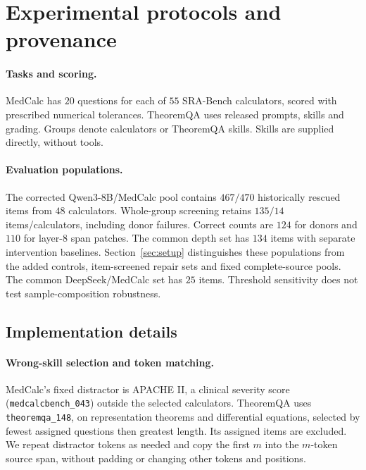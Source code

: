 \section{Experimental protocols and provenance}
\label{app:setup}

\paragraph{Tasks and scoring.}
MedCalc has $20$ questions for each of $55$ SRA-Bench calculators, scored
with prescribed numerical tolerances. TheoremQA uses released prompts,
skills and grading. Groups denote calculators or TheoremQA skills.
Skills are supplied directly, without tools.

\paragraph{Evaluation populations.}
The corrected Qwen3-8B/MedCalc pool contains $467/470$ historically rescued
items from $48$ calculators. Whole-group screening retains $135/14$
items/calculators, including donor failures. Correct counts are $124$ for
donors and $110$ for layer-$8$ span patches. The common depth set has $134$
items with separate intervention baselines. Section~\ref{sec:setup}
distinguishes these populations from the added controls, item-screened
repair sets and fixed complete-source pools. The common DeepSeek/MedCalc
set has $25$ items. Threshold sensitivity does not test sample-composition
robustness.

\subsection{Implementation details}
\label{app:detail}

\paragraph{Wrong-skill selection and token matching.}
MedCalc's fixed distractor is APACHE II, a clinical severity score
(\texttt{medcalcbench\_043}) outside the selected calculators. TheoremQA
uses \texttt{theoremqa\_148}, on representation theorems and differential
equations, selected by fewest assigned questions then greatest length.
Its assigned items are excluded. We repeat distractor tokens as needed
and copy the first $m$ into the $m$-token source span, without padding
or changing other tokens and positions.

